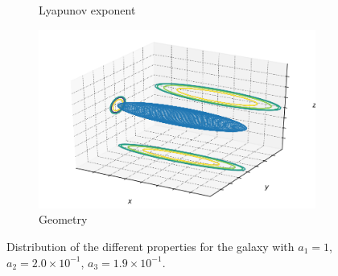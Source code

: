 \begin{figure}[h]
\begin{subfigure}[t]{0.4\textwidth}
        \caption{Lyapunov exponent}
    \end{subfigure}
    \begin{subfigure}[t]{0.4\textwidth}
        \includegraphics[width=\textwidth]{"../Files/Week 13/images/11_ellipsoid"}
        \caption{Geometry}
    \end{subfigure}
    \caption{Distribution of the different properties for the galaxy with $a_1 = 1$, $a_2 = 2.0\times10^{-1}$, $a_3 = 1.9\times10^{-1}$.}
    \label{fig: g27}
\end{figure}


